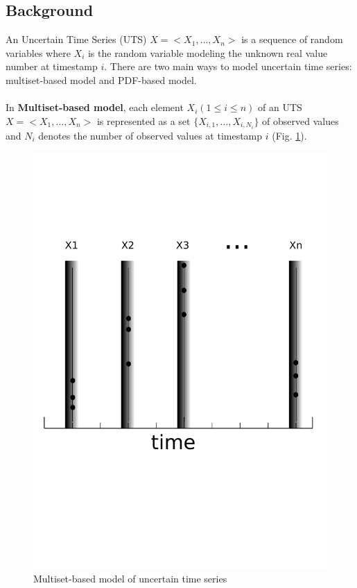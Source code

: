 \subsection{Background}

An Uncertain Time Series (UTS) $X=<X_1, \ldots, X_n>$  is a sequence of random
variables where $X_i$  is the random variable modeling the unknown real value
number at timestamp $i$. There are two main ways to model uncertain time series:
multiset-based model and PDF-based model.   

\paragraph{}In \textbf{Multiset-based model}, each element $X_i (1 \leq i \leq n)$ of an UTS $X = <X_1, \ldots,  X_n>$ is represented as a set $\{X_{i,1}, \ldots, X_{i,N_i}\}$ of observed values and $N_i$
  denotes the number of observed values at timestamp $i$ (Fig. \ref{multiset}).
  
 \begin{figure}[h]
  \centering
   \includegraphics[scale=0.4]{images/multiset2}
    \caption{Multiset-based model of uncertain time series}
  \label{multiset}
  \end{figure}

